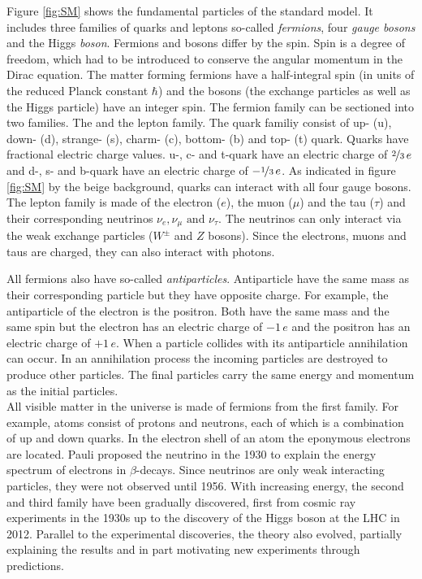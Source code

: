 \documentclass[a4paper,11pt,twosided,final,german,openbib,pdftex,listof=totoc,bibliography=totoc]{scrbook}
\begin{document}
Figure \ref{fig:SM} shows the fundamental particles of the standard model. It includes three families of quarks and leptons so-called \textit{fermions}, four \textit{gauge bosons} and the Higgs \textit{boson}. Fermions and bosons differ by the spin. Spin is a degree of freedom, which had to be introduced to conserve the angular momentum in the Dirac equation. The matter forming fermions have a half-integral spin (in units of the reduced Planck constant $\hbar$) and the bosons (the exchange particles as well as the Higgs particle) have an integer spin. The fermion family can be sectioned into two families. The  and the lepton family. 
The quark familiy consist of up- (u), down- (d), strange- (s), charm- (c), bottom- (b) and top- (t) quark. Quarks have fractional electric charge values. u-, c- and t-quark have an electric charge of $\nicefrac{2}{3} \,e$ and d-, s- and b-quark have an electric charge of $-\nicefrac{1}{3} \,e$. As indicated in figure \ref{fig:SM} by the beige background, quarks can interact with all four gauge bosons.
The lepton family is made of the electron ($e$), the muon ($\mu$) and the tau ($\tau$) and their corresponding neutrinos $\nu_e,\nu_{\mu} \textrm{ and } \nu_{\tau}$. The neutrinos can only interact via the weak exchange particles ($W^{\pm}$ and $Z$ bosons). Since the electrons, muons and taus are charged, they can also interact with photons.

All fermions also have so-called \textit{antiparticles}. Antiparticle have the same mass as their corresponding particle but they have opposite charge. For example, the antiparticle of the electron is the positron. Both have the same mass and the same spin but the electron has an electric charge of $-1\,e$ and the positron has an electric charge of $+1\,e$. When a particle collides with its antiparticle annihilation can occur. In an annihilation process the incoming particles are destroyed to produce other particles. The final particles carry the same energy and momentum as the initial particles.\\


All visible matter in the universe is made of fermions from the first family. For example, atoms consist of protons and neutrons, each of which is a combination of up and down quarks. In the electron shell of an atom the eponymous electrons are located. Pauli proposed the neutrino in the 1930 to explain the energy spectrum of electrons in $\beta$-decays. Since neutrinos are only weak interacting particles, they were not observed until 1956.\cite{REINES19941} With increasing energy, the second and third family have been gradually discovered, first from cosmic ray experiments in the 1930s up to the discovery of the Higgs boson at the LHC in 2012. Parallel to the experimental discoveries, the theory also evolved, partially explaining the results and in part motivating new experiments through predictions.
\end{document}
